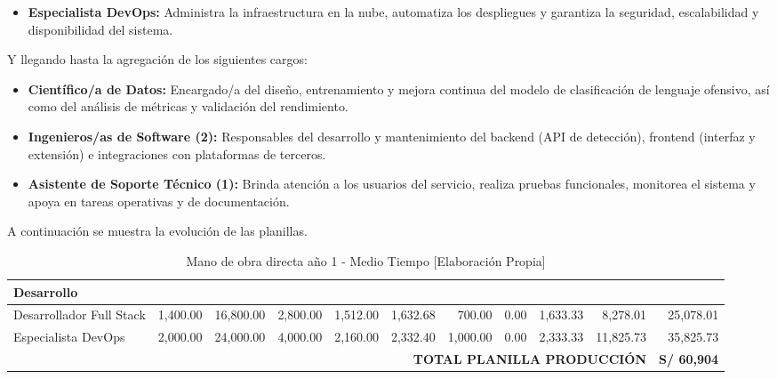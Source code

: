 \begin{itemize}
    \item \textbf{Especialista DevOps:} Administra la infraestructura en la nube, automatiza los despliegues y garantiza la seguridad, escalabilidad y disponibilidad del sistema.
\end{itemize}

Y llegando hasta la agregación de los siguientes cargos:

\begin{itemize}
    \item \textbf{Científico/a de Datos:} Encargado/a del diseño, entrenamiento y mejora continua del modelo de clasificación de lenguaje ofensivo, así como del análisis de métricas y validación del rendimiento.

    \item \textbf{Ingenieros/as de Software (2):} Responsables del desarrollo y mantenimiento del backend (API de detección), frontend (interfaz y extensión) e integraciones con plataformas de terceros.

    \item \textbf{Asistente de Soporte Técnico (1):} Brinda atención a los usuarios del servicio, realiza pruebas funcionales, monitorea el sistema y apoya en tareas operativas y de documentación.
\end{itemize}

A continuación se muestra la evolución de las planillas.

\begin{table}[H]
\centering
\scriptsize
\renewcommand{\arraystretch}{1.15}
\setlength{\tabcolsep}{3pt}
\begin{tabular}{|l|r|r|r|r|r|r|r|r|r|r|}
\hline
\multicolumn{11}{|l|}{\textbf{Desarrollo}} \\ \hline
Desarrollador Full Stack & 1,400.00 & 16,800.00 & 2,800.00 & 1,512.00 & 1,632.68 & 700.00 & 0.00 & 1,633.33 & 8,278.01 & 25,078.01 \\ \hline
Especialista DevOps & 2,000.00 & 24,000.00 & 4,000.00 & 2,160.00 & 2,332.40 & 1,000.00 & 0.00 & 2,333.33 & 11,825.73 & 35,825.73 \\ \hline
\multicolumn{10}{|r|}{\textbf{TOTAL PLANILLA PRODUCCIÓN}} & \textbf{S/ 60,904} \\ \hline
\end{tabular}
\caption{Mano de obra directa año 1 - Medio Tiempo [Elaboración Propia]}
\label{fig:mano-obra-directa-anio1}
\end{table}

